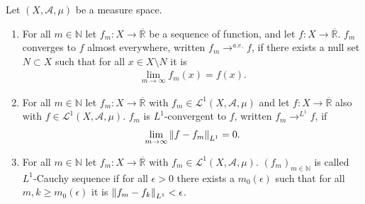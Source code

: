 \begin{definition}
    Let \( (X, \mathcal{A}, \mu) \) be a measure space.
    \begin{enumerate}
        \item For all \(m \in \mathbb{N}\) let \(f_m: X \rightarrow \overline{\mathbb{R}}\) be a sequence of function, and let \(f: X \rightarrow \overline{\mathbb{R}}\). \(f_m\) converges to \(f\) almost everywhere, written \(f_m \rightarrow^{a.e.} f\), if there exists a null set \(N \subset X\) such that for all \(x \in X \setminus N\) it is
        \begin{align}
            \lim_{m \rightarrow \infty} f_m(x) = f(x) \text{.}
        \end{align}
        \item For all \(m \in \mathbb{N}\) let \(f_m: X \rightarrow \overline{\mathbb{R}}\) with \(f_m \in \mathcal{L}^1 (X, \mathcal{A}, \mu) \) and let \(f: X \rightarrow \overline{\mathbb{R}}\) also with \(f \in \mathcal{L}^1 (X, \mathcal{A}, \mu) \). \(f_m\) is \(L^1\)-convergent to \(f\), written \(f_m \rightarrow^{L^1} f\), if
        \begin{align}
            \lim_{m \rightarrow \infty} \left\lVert f - f_m\right\rVert_{L^1} = 0 \text{.}
        \end{align}
        \item For all \(m \in \mathbb{N}\) let \(f_m: X \rightarrow \overline{\mathbb{R}}\) with \(f_m \in \mathcal{L}^1 (X, \mathcal{A}, \mu) \). \((f_m)_{m \in \mathbb{N}}\) is called \(L^1\)-Cauchy sequence if for all \(\epsilon > 0\) there exists a \(m_0(\epsilon)\) such that for all \(m, k \geq m_0(\epsilon)\) it is \(\left\lVert f_m - f_k\right\rVert_{L^1} < \epsilon \).
    \end{enumerate}
\end{definition}